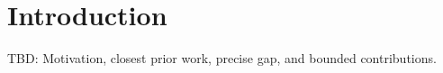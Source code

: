 \section{Introduction}
TBD: Motivation, closest prior work, precise gap, and bounded contributions.
